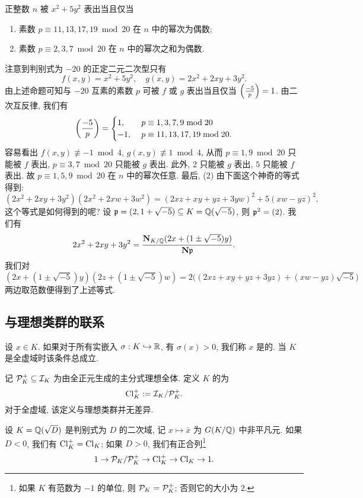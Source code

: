 \begin{example}
正整数 $n$ 被 $x^2+5y^2$ 表出当且仅当
\begin{enumerate}
\item 素数 $p\equiv 11,13,17,19\bmod{20}$ 在 $n$ 中的幂次为偶数;
\item 素数 $p\equiv 2,3,7\bmod{20}$ 在 $n$ 中的幂次之和为偶数.
\end{enumerate}
注意到判别式为 $-20$ 的正定二元二次型只有
	\[f(x,y)=x^2+5y^2,\quad g(x,y)=2x^2+2xy+3y^2.\]
由上述命题可知与 $-20$ 互素的素数 $p$ 可被 $f$ 或 $g$ 表出当且仅当 $\left(\frac{{-5}}{p}\right)=1$. 由二次互反律, 我们有
	\[\left(\frac{{-5}}{p}\right)=\begin{cases}
	1,&p\equiv 1,3,7,9\bmod{20}\\
	-1,\ &p\equiv 11,13,17,19\bmod{20}.
	\end{cases}	\]
容易看出 $f(x,y)\not\equiv -1\bmod 4$, $g(x,y)\not\equiv 1\bmod 4$, 从而 $p\equiv 1,9\bmod{20}$ 只能被 $f$ 表出, $p\equiv 3,7\bmod{20}$ 只能被 $g$ 表出. 此外, $2$ 只能被 $g$ 表出, $5$ 只能被 $f$ 表出. 故 $p\equiv 1,5,9\bmod{20}$ 在 $n$ 中的幂次任意. 最后, (2) 由下面这个神奇的等式得到:
	\[(2x^2+2xy+3y^2)(2x^2+2xw+3w^2)=(2xz+xy+yz+3yw)^2+5(xw-yz)^2.\]
这个等式是如何得到的呢? 设 ${\mathfrak{p}}=(2,1+\sqrt{-5})\subseteq K={\mathbb{Q}}(\sqrt{-5})$, 则 ${\mathfrak{p}}^2=(2)$. 我们有
	\[2x^2+2xy+3y^2=\frac{{\mathbf{N}}_{K/{\mathbb{Q}}}(2x+(1\pm \sqrt{-5}) y)}{{\mathbf{N}}{\mathfrak{p}}}.\]
我们对
	\[(2x+(1\pm \sqrt{-5}) y)(2z+(1\pm \sqrt{-5}) w)=2\bigl((2xz+xy+yz+3yz)+(xw-yz)\sqrt{-5}\bigr)\]
两边取范数便得到了上述等式.
\end{example}


\subsection{与理想类群的联系}
\begin{definition}{}{}
设 $x\in K$. 如果对于所有实嵌入 $\sigma:K\hookrightarrow {\mathbb{R}}$, 有 $\sigma(x)>0$, 我们称 $x$ 是的. 当 $K$ 是全虚域时该条件总成立.

记 ${\mathcal{P}}_K^+\subseteq {\mathcal{I}}_K$ 为由全正元生成的主分式理想全体. 定义 $K$ 的为
	\[{\mathrm{Cl}}_K^+:={\mathcal{I}}_K/{\mathcal{P}}_K^+.\]
对于全虚域, 该定义与理想类群并无差异.
\end{definition}

设 $K={\mathbb{Q}}(\sqrt{D})$ 是判别式为 $D$ 的二次域, 记 $x\mapsto \bar x$ 为 $G(K/{\mathbb{Q}})$ 中非平凡元. 如果 $D<0$, 我们有 ${\mathrm{Cl}}_K^+={\mathrm{Cl}}_K$; 如果 $D>0$, 我们有正合列\footnote{如果 $K$ 有范数为 $-1$ 的单位, 则 ${\mathcal{P}}_K={\mathcal{P}}_K^+$; 否则它的大小为 $2$.}
	\[1\rightarrow {\mathcal{P}}_K/{\mathcal{P}}_K^+\rightarrow {\mathrm{Cl}}_K^+\rightarrow {\mathrm{Cl}}_K\rightarrow 1.\]

